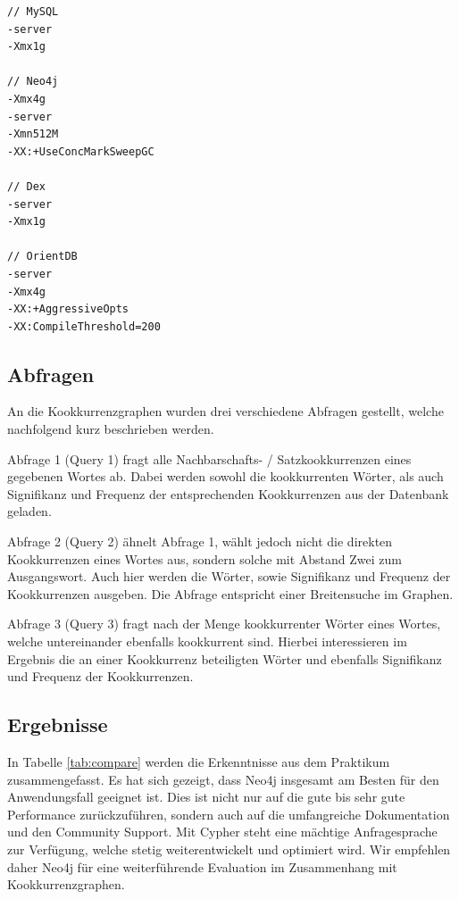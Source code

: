 \documentclass[11pt, a4paper, oneside]{article} %
\begin{document}
\begin{lstlisting}
// MySQL
-server
-Xmx1g

// Neo4j
-Xmx4g
-server
-Xmn512M
-XX:+UseConcMarkSweepGC

// Dex
-server
-Xmx1g

// OrientDB
-server
-Xmx4g
-XX:+AggressiveOpts 
-XX:CompileThreshold=200
\end{lstlisting}

\subsection{Abfragen}

An die Kookkurrenzgraphen wurden drei verschiedene Abfragen gestellt, welche nachfolgend kurz beschrieben werden.

Abfrage 1 (Query 1) fragt alle Nachbarschafts- / Satzkookkurrenzen eines gegebenen Wortes ab. Dabei werden sowohl die kookkurrenten Wörter, als auch Signifikanz und Frequenz der entsprechenden Kookkurrenzen aus der Datenbank geladen.

Abfrage 2 (Query 2) ähnelt Abfrage 1, wählt jedoch nicht die direkten Kookkurrenzen eines Wortes aus, sondern solche mit Abstand Zwei zum Ausgangswort. Auch hier werden die Wörter, sowie Signifikanz und Frequenz der Kookkurrenzen ausgeben. Die Abfrage entspricht einer Breitensuche im Graphen.

Abfrage 3 (Query 3) fragt nach der Menge kookkurrenter Wörter eines Wortes, welche untereinander ebenfalls kookkurrent sind. Hierbei interessieren im Ergebnis die an einer Kookkurrenz beteiligten Wörter und ebenfalls Signifikanz und Frequenz der Kookkurrenzen.

\subsection{Ergebnisse}

In Tabelle \ref{tab:compare} werden die Erkenntnisse aus dem Praktikum zusammengefasst. Es hat sich gezeigt, dass Neo4j insgesamt am Besten für den Anwendungsfall geeignet ist. Dies ist nicht nur auf die gute bis sehr gute Performance zurückzuführen, sondern auch auf die umfangreiche Dokumentation und den Community Support. Mit Cypher steht eine mächtige Anfragesprache zur Verfügung, welche stetig weiterentwickelt und optimiert wird. Wir empfehlen daher Neo4j für eine weiterführende Evaluation im Zusammenhang mit Kookkurrenzgraphen.

\renewcommand{\arraystretch}{1.5}
\end{document}
